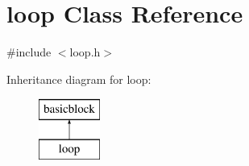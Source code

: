 \hypertarget{classloop}{
\section{loop Class Reference}
\label{classloop}
}


{\ttfamily \#include $<$loop.h$>$}

Inheritance diagram for loop:\begin{figure}[H]
\begin{center}
\leavevmode
\includegraphics[height=2.000000cm]{classloop}
\end{center}
\end{figure}

